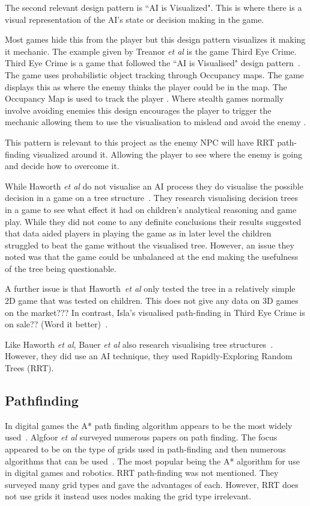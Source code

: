 \documentclass[journal]{IEEEtran}
\begin{document}
The second relevant design pattern is ``AI is Visualized". This is where there is a visual representation of the AI's state or decision making in the game. 

Most games hide this from the player but this design pattern visualizes it making it mechanic.  
The example given by Treanor \textit{et al} is the game Third Eye Crime.  Third Eye Crime is a game that followed the ``AI is Visualised" design pattern~\cite{Isla2014, game:ThirdEyeCrime}.  
The game uses probabilistic object tracking through Occupancy maps. The game displays this as where the enemy thinks the player could be in the map.  The Occupancy Map is used to track the player \cite{Isla2014}.   Where stealth games normally involve avoiding enemies this design encourages the player to trigger the mechanic allowing them to use the visualisation to mislead and avoid the enemy \cite{Isla2014, game:ThirdEyeCrime}.  

This pattern is relevant to this project as the enemy NPC  will have  RRT path-finding visualized around it. Allowing the player to see where the enemy is going and decide how to overcome it.

While Haworth \textit{et al} do not visualise an AI process they do visualise the possible decision in a game on a tree structure~\cite{Haworth2010}. They research visualising decision trees in a game to see what effect it had on children's analytical reasoning and game play.  While they did not come to any definite conclusions their results suggested that data aided players in playing the game as in later level the children struggled to beat the game without the visualised tree. However, an issue they noted was that the game could be unbalanced at the end making the usefulness of the tree being questionable.  

A further issue is that Haworth~\textit{et al} only tested the tree in a relatively simple 2D game that was tested on children. This does not give any data on 3D games on the market??? In contrast, Isla's visualised path-finding in Third Eye Crime is on sale?? (Word it better)~\cite{Isla2014}.
 
Like  Haworth \textit{et al}, Bauer \textit{et al} also research visualising tree structures~\cite{bauer2012}. However, they did use an AI technique, they used Rapidly-Exploring Random Trees (RRT).

\subsection{Pathfinding}
In digital games the A* path finding algorithm appears to be the most widely used~\cite{Algfoor2015}.  Algfoor \textit{et al} surveyed numerous papers on path finding. The focus appeared to be on the type of grids used in path-finding and then numerous algorithms that can be used~\cite{Algfoor2015}. The most popular being the A* algorithm for use in digital games and robotics. RRT path-finding was not mentioned. 
They surveyed many grid types and gave the advantages of each. However, RRT does not use grids it instead uses nodes making the grid type irrelevant.\\
\end{document}
